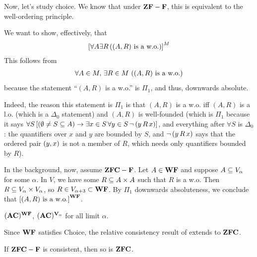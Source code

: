 Now, let's study choice. We know that under $\mathbf{ZF} - \mathbf{F}$, this is equivalent to the well-ordering principle.

We want to show, effectively, that
\begin{align*}
    \left[ \forall A \exists R \left( (A, R) \text{ is a w.o.} \right) \right]^M
\end{align*}
This follows from
\begin{align*}
    \forall A \in M, \, \exists R \in M \, \left( (A, R) \text{ is a w.o.} \right)
\end{align*}
because the statement ``$(A, R)$ is a w.o.'' is $\Pi_1$, and thus, downwards absolute.

Indeed, the reason this statement is $\Pi_1$ is that $(A, R)$ is a w.o. iff $(A, R)$ is a l.o. (which is a $\Delta_0$ statement) and $(A, R)$ is well-founded (which is $\Pi_1$ because it says $\forall S \left[ \left( \emptyset \ne S \subseteq A \right) \to \exists x \in S \, \forall y \in S \, \neg\left( y \, R \, x \right) \right]$, and everything after $\forall S$ is $\Delta_0$: the quantifiers over $x$ and $y$ are bounded by $S$, and $\neg\left( y \, R \, x \right)$ says that the ordered pair $\left( y, x \right)$ is not a member of $R$, which needs only quantifiers bounded by $R$). %

In the background, now, assume $\mathbf{ZFC} - \mathbf{F}$. Let $A \in \mathbf{WF}$ and suppose $A \subseteq V_{\alpha}$ for some $\alpha$. In $V$, we have some $R \subseteq A \times A$ such that $R$ is a w.o. Then $R \subseteq V_{\alpha} \times V_{\alpha}$, so $R \in V_{\alpha + 3} \subset \mathbf{WF}$. By $\Pi_1$ downwards absoluteness, we conclude that $\left[ (A, R) \text{ is a w.o.} \right]^{\mathbf{WF}}$.

\begin{boxcorollary}
    $(\mathbf{AC})^{\mathbf{WF}}$, $(\mathbf{AC})^{\mathbf{V}_{\alpha}}$ for all limit $\alpha$.
\end{boxcorollary}

Since $\mathbf{WF}$ satisfies Choice, the relative consistency result of  extends to $\mathbf{ZFC}$.

\begin{boxcorollary}
    If $\mathbf{ZFC} - \mathbf{F}$ is consistent, then so is $\mathbf{ZFC}$.
\end{boxcorollary}

